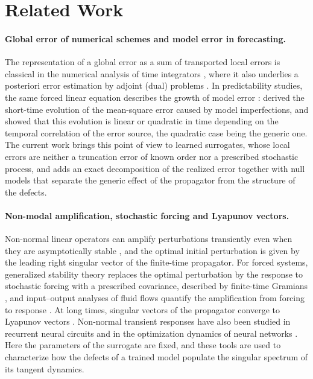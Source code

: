 \section{Related Work}
\label{sec:related}

\paragraph{Global error of numerical schemes and model error in forecasting.}
The representation of a global error as a sum of transported local errors is classical in the numerical analysis of time integrators \citep[Section~II.3]{hairer1993}, where it also underlies a posteriori error estimation by adjoint (dual) problems \citep{estep1995,cao2004,giles2002}. In predictability studies, the same forced linear equation describes the growth of model error \citep{orrell2001}: \citet{nicolis2003,nicolis2004} derived the short-time evolution of the mean-square error caused by model imperfections, and \citet{vannitsem2002} showed that this evolution is linear or quadratic in time depending on the temporal correlation of the error source, the quadratic case being the generic one. The current work brings this point of view to learned surrogates, whose local errors are neither a truncation error of known order nor a prescribed stochastic process, and adds an exact decomposition of the realized error together with null models that separate the generic effect of the propagator from the structure of the defects.

\paragraph{Non-modal amplification, stochastic forcing and Lyapunov vectors.}
Non-normal linear operators can amplify perturbations transiently even when they are asymptotically stable \citep{trefethen1993,reddy1993,schmid2007}, and the optimal initial perturbation is given by the leading right singular vector of the finite-time propagator. For forced systems, generalized stability theory replaces the optimal perturbation by the response to stochastic forcing with a prescribed covariance, described by finite-time Gramians \citep{farrell1996a,farrell1996b}, and input--output analyses of fluid flows quantify the amplification from forcing to response \citep{jovanovic2005}. At long times, singular vectors of the propagator converge to Lyapunov vectors \citep{legras1996,ginelli2007,kuptsov2012}. Non-normal transient responses have also been studied in recurrent neural circuits \citep{hennequin2012} and in the optimization dynamics of neural networks \citep{ghosh2026}. Here the parameters of the surrogate are fixed, and these tools are used to characterize how the defects of a trained model populate the singular spectrum of its tangent dynamics.

